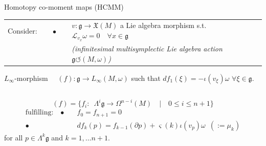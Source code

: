 \documentclass[beamer,10pt]{standalone}
\begin{document}
\begin{frame}[shrink]{Homotopy co-moment maps (HCMM)}	

		\begin{tabular}{lll}
			\quad Consider: 
			&$\quad\bullet\quad$
			& $v:\mathfrak g\to \mathfrak X(M)$  a Lie algebra morphism 
			s.t. $\mathcal{L}_{v_x}\omega=0 \quad  \forall x\in\mathfrak g$\\
			& & \emph{(infinitesimal multisymplectic Lie algebra action $\mathfrak{g}\circlearrowleft (M,\omega)$)}
		\end{tabular} 
		\vspace{.5em}
		\begin{defblock}
			\vspace{.25em}
			\centering
			\parbox{0.96\linewidth}{%
  				$L_\infty$-morphism $\quad(f): \mathfrak{g} \to L_\infty(M,\omega)$
  				 \quad such that \quad
  				 $d f_1 (\xi) = -\iota(v_\xi) \omega $ $\forall \xi \in \mathfrak{g}$.
  		}
		\end{defblock}
		\begin{columns}
			\begin{column}{.625\textwidth}			
				\begin{propblock}[HCMM unfolded]
					\begin{displaymath}
						(f)  = \big\{ f_i: \,\,\, \Lambda^i {\mathfrak g} \to \Omega^{n-i}(M)
						\quad \vert \quad 
						0\leq i \leq n+1  \big\}	
					\end{displaymath}
					\begin{displaymath}
						\begin{split}
							\text{fulfilling:}\quad
							\bullet\quad & f_0 = f_{n+1} = 0
							\\
							\bullet\quad & d f_k (p) = f_{k-1} (\partial p)  
							+ \varsigma(k) \iota(v_p) \omega
							\; ~( := \mu_k )
						\end{split}
					\end{displaymath}	
					for all $p \in \Lambda^k\mathfrak{g}$ and $k=1,\dots n+1$.	
				\end{propblock}
			\end{column}

\end{columns}
\end{frame}
\end{document}
